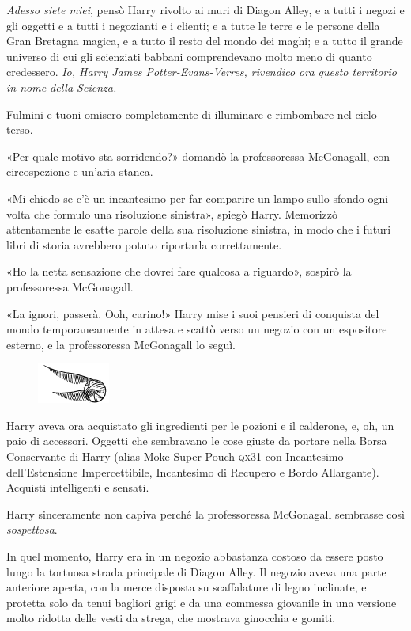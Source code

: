 \textit{Adesso siete miei}, pensò Harry rivolto ai muri di Diagon Alley, e a tutti i negozi e gli oggetti e a tutti i negozianti e i clienti; e a tutte le terre e le persone della Gran Bretagna magica, e a tutto il resto del mondo dei maghi; e a tutto il grande universo di cui gli scienziati babbani comprendevano molto meno di quanto credessero. \textit{Io, Harry James Potter-Evans-Verres, rivendico ora questo territorio in nome della Scienza.}

Fulmini e tuoni omisero completamente di illuminare e rimbombare nel cielo terso.

«Per quale motivo sta sorridendo?» domandò la professoressa McGonagall, con circospezione e un’aria stanca.

«Mi chiedo se c’è un incantesimo per far comparire un lampo sullo sfondo ogni volta che formulo una risoluzione sinistra», spiegò Harry. Memorizzò attentamente le esatte parole della sua risoluzione sinistra, in modo che i futuri libri di storia avrebbero potuto riportarla correttamente.

«Ho la netta sensazione che dovrei fare qualcosa a riguardo», sospirò la professoressa McGonagall.

«La ignori, passerà. Ooh, carino!» Harry mise i suoi pensieri di conquista del mondo temporaneamente in attesa e scattò verso un negozio con un espositore esterno, e la professoressa McGonagall lo seguì.

\begin{figure}[h]
\includegraphics[scale=0.4]{boccino.png}
\centering
\end{figure}

Harry aveva ora acquistato gli ingredienti per le pozioni e il calderone, e, oh, un paio di accessori. Oggetti che sembravano le cose giuste da portare nella Borsa Conservante di Harry (alias Moke Super Pouch \textsc{qx}31 con Incantesimo dell’Estensione Impercettibile, Incantesimo di Recupero e Bordo Allargante). Acquisti intelligenti e sensati.

Harry sinceramente non capiva perché la professoressa McGonagall sembrasse così \textit{sospettosa}.

In quel momento, Harry era in un negozio abbastanza costoso da essere posto lungo la tortuosa strada principale di Diagon Alley. Il negozio aveva una parte anteriore aperta, con la merce disposta su scaffalature di legno inclinate, e protetta solo da tenui bagliori grigi e da una commessa giovanile in una versione molto ridotta delle vesti da strega, che mostrava ginocchia e gomiti.

